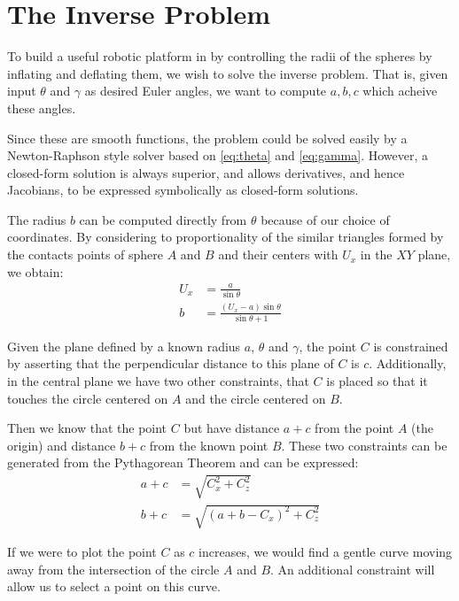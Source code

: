 \documentclass{article}
\begin{document}
\section{The Inverse Problem}

To build a useful robotic platform in by controlling the radii of the
spheres by inflating and deflating them, we wish to solve the inverse
problem. That is, given input $\theta$ and $\gamma$ as desired Euler
angles, we want to compute $a,b,c$ which acheive these angles.

Since these are smooth functions, the problem could be solved
easily by a Newton-Raphson style solver based on \ref{eq:theta} and \ref{eq:gamma}.
However, a closed-form solution is always superior, and allows derivatives,
and hence Jacobians, to be expressed symbolically as closed-form solutions.

The radius $b$ can be computed directly from $\theta$
because of our choice of coordinates.
By considering to proportionality of the similar triangles formed
by the contacts points of sphere $A$ and $B$ and their centers with $U_x$ in the $XY$ plane,
we obtain:
\begin{align}
  U_x &= \frac{a}{\sin{\theta}} \\
  b &= \frac{(U_x - a)\sin{\theta}}{\sin{\theta}+1}
\end{align}

\newcommand{\abs}[1]{ \left\lvert#1\right\rvert}

Given the plane defined by a known radius $a$, $\theta$ and $\gamma$,
the point $C$ is constrained by asserting that the perpendicular
distance to this plane of $C$ is $c$.
Additionally, in the central plane we have two other constraints,
that $C$ is placed so that it touches the circle centered on $A$ and
the circle centered on $B$.

Then we know that the point $C$ but have distance $a+c$ from
the point $A$ (the origin) and distance $b+c$ from the known
point $B$. These two constraints can be generated from the Pythagorean Theorem and can be expressed:
\begin{align}
a + c &= \sqrt{C_x^2 + C_z ^2} \label{eq:a_constraint}\\
b + c &= \sqrt{(a+b-C_x)^2 + C_z^2} \label{eq:b_constraint}
\end{align}

If we were to plot the point $C$ as $c$ increases, we
would find a gentle curve moving away from the intersection
of the circle $A$ and $B$. An additional constraint will
allow us to select a point on this curve.
\end{document}
